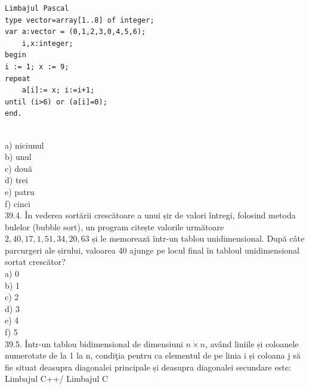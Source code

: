 \begin{itemize}
\begin{enumerate}
\begin{verbatim}
Limbajul Pascal
type vector=array[1..8] of integer;
var a:vector = (0,1,2,3,0,4,5,6);
    i,x:integer;
begin
i := 1; x := 9;
repeat
    a[i]:= x; i:=i+1;
until (i>6) or (a[i]=0);
end.
\end{verbatim}
\\
a) niciunul
\\
b) unul
\\
c) două
\\
d) trei
\\
e) patru
\\
f) cinci
\\
39.4. În vederea sortării crescătoare a unui șir de valori întregi, folosind metoda bulelor (bubble sort), un program citește valorile următoare $2,40,17,1,51,34,20,63$ și le memorează într-un tablou unidimensional. După câte parcurgeri ale șirului, valoarea 40 ajunge pe locul final în tabloul unidimensional sortat crescător?
\\
a) 0
\\
b) 1
\\
c) 2
\\
d) 3
\\
e) 4
\\
f) 5
\\
39.5. Într-un tablou bidimensional de dimensiuni $n \times n$, având liniile și coloanele numerotate de la 1 la n, condiţia pentru ca elementul de pe linia i și coloana j să fie situat deasupra diagonalei principale și deasupra diagonalei secundare este:
\\
Limbajul C++/ Limbajul C


\end{enumerate}
\end{itemize}
